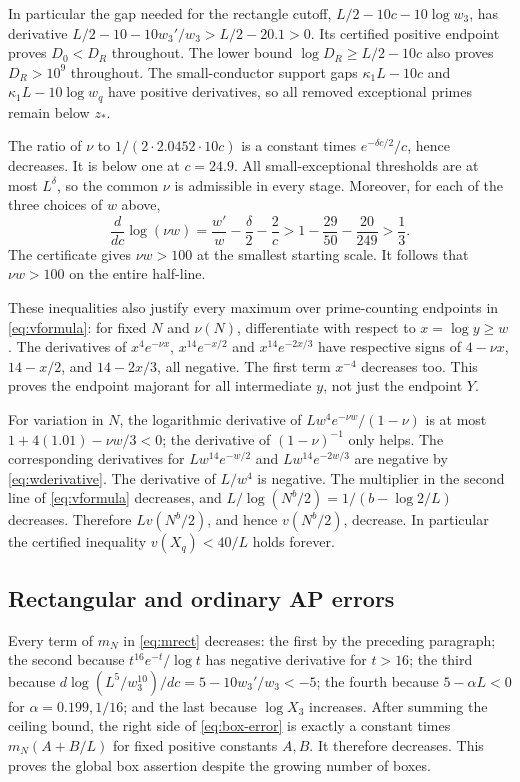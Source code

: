 \documentclass[11pt]{article}
\theoremstyle{definition}
\begin{document}
In particular the gap needed for the rectangle cutoff,
$L/2-10c-10\log w_3$, has derivative
$L/2-10-10w_3'/w_3>L/2-20.1>0$.
Its certified positive endpoint proves $D_0<D_R$ throughout.
The lower bound $\log D_R\ge L/2-10c$ also proves
$D_R>10^9$ throughout.  The small-conductor support gaps
$\kappa_1L-10c$ and $\kappa_1L-10\log w_q$ have positive
derivatives, so all removed exceptional primes remain below $z_*$.

The ratio of $\nu$ to $1/(2\cdot2.0452\cdot10c)$ is a constant
times $e^{-\delta c/2}/c$, hence decreases.
It is below one at $c=24.9$.  All small-exceptional thresholds are at
most $L^\delta$, so the common $\nu$ is admissible in every stage.
Moreover, for each of the three choices of $w$ above,
\begin{equation}\label{eq:nu-growth}
 \frac{d}{dc}\log(\nu w)
 =\frac{w'}w-\frac{\delta}{2}-\frac2c
 >1-\frac{29}{50}-\frac{20}{249}>\frac13.
\end{equation}
The certificate gives $\nu w>100$ at the smallest starting scale.
It follows that $\nu w>100$ on the entire half-line.

These inequalities also justify every maximum over prime-counting
endpoints in \eqref{eq:vformula}: for fixed $N$ and $\nu(N)$,
differentiate with respect to $x=\log y\ge w$.
The derivatives of $x^4e^{-\nu x}$,
$x^{14}e^{-x/2}$ and $x^{14}e^{-2x/3}$ have respective signs of
$4-\nu x$, $14-x/2$, and $14-2x/3$, all negative.
The first term $x^{-4}$ decreases too.  This proves the endpoint
majorant for all intermediate $y$, not just the endpoint $Y$.

For variation in $N$, the logarithmic derivative of
$Lw^4e^{-\nu w}/(1-\nu)$ is at most
$1+4(1.01)-\nu w/3<0$; the derivative of $(1-\nu)^{-1}$ only
helps.  The corresponding derivatives for
$Lw^{14}e^{-w/2}$ and $Lw^{14}e^{-2w/3}$ are negative by
\eqref{eq:wderivative}.  The derivative of $L/w^4$ is negative.
The multiplier in the second line of \eqref{eq:vformula} decreases,
and $L/\log(N^b/2)=1/(b-\log2/L)$ decreases.
Therefore $Lv(N^b/2)$, and hence $v(N^b/2)$, decrease.
In particular the certified inequality $v(X_q)<40/L$ holds forever.

\subsection{Rectangular and ordinary AP errors}

Every term of $m_N$ in \eqref{eq:mrect} decreases:
the first by the preceding paragraph;
the second because $t^{16}e^{-t}/\log t$ has negative derivative
for $t>16$; the third because
$d\log(L^5/w_3^{10})/dc=5-10w_3'/w_3<-5$;
the fourth because $5-\alpha L<0$ for
$\alpha=0.199,1/16$; and the last because $\log X_3$ increases.
After summing the ceiling bound, the right side of
\eqref{eq:box-error} is exactly a constant times
$m_N(A+B/L)$ for fixed positive constants $A,B$.
It therefore decreases.  This proves the global box assertion despite
the growing number of boxes.
\end{document}
